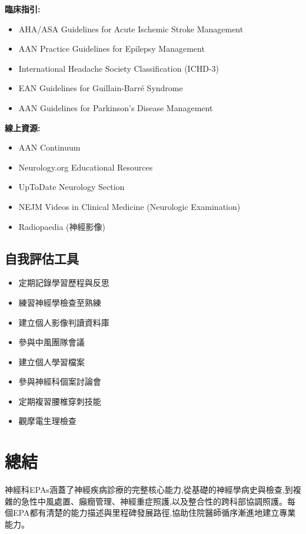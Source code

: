 \documentclass[12pt,a4paper]{article}
\begin{document}
\textbf{臨床指引:}
\begin{itemize}
    \item AHA/ASA Guidelines for Acute Ischemic Stroke Management
    \item AAN Practice Guidelines for Epilepsy Management
    \item International Headache Society Classification (ICHD-3)
    \item EAN Guidelines for Guillain-Barré Syndrome
    \item AAN Guidelines for Parkinson's Disease Management
\end{itemize}

\textbf{線上資源:}
\begin{itemize}
    \item AAN Continuum
    \item Neurology.org Educational Resources
    \item UpToDate Neurology Section
    \item NEJM Videos in Clinical Medicine (Neurologic Examination)
    \item Radiopaedia (神經影像)
\end{itemize}

\subsection{自我評估工具}
\begin{itemize}[nosep]
    \item 定期記錄學習歷程與反思
    \item 練習神經學檢查至熟練
    \item 建立個人影像判讀資料庫
    \item 參與中風團隊會議
    \item 建立個人學習檔案
    \item 參與神經科個案討論會
    \item 定期複習腰椎穿刺技能
    \item 觀摩電生理檢查
\end{itemize}

\section{總結}

神經科EPAs涵蓋了神經疾病診療的完整核心能力,從基礎的神經學病史與檢查,到複雜的急性中風處置、癲癇管理、神經重症照護,以及整合性的跨科部協調照護。每個EPA都有清楚的能力描述與里程碑發展路徑,協助住院醫師循序漸進地建立專業能力。
\end{document}
